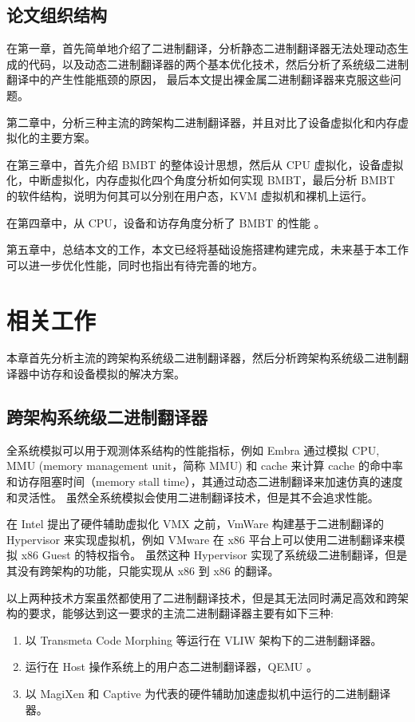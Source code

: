 \section {论文组织结构}
在第一章，首先简单地介绍了二进制翻译，分析静态二进制翻译器无法处理动态生成的代码，以及动态二进制翻译器的两个基本优化技术，然后分析了系统级二进制翻译中的产生性能瓶颈的原因，
最后本文提出裸金属二进制翻译器来克服这些问题。

第二章中，分析三种主流的跨架构二进制翻译器，并且对比了设备虚拟化和内存虚拟化的主要方案。

在第三章中，首先介绍 BMBT 的整体设计思想，然后从 CPU 虚拟化，设备虚拟化，中断虚拟化，内存虚拟化四个角度分析如何实现 BMBT，最后分析 BMBT 的软件结构，说明为何其可以分别在用户态，KVM 虚拟机和裸机上运行。

在第四章中，从 CPU，设备和访存角度分析了 BMBT 的性能 。

第五章中，总结本文的工作，本文已经将基础设施搭建构建完成，未来基于本工作可以进一步优化性能，同时也指出有待完善的地方。

\chapter{相关工作}\label{chap:related_work}
本章首先分析主流的跨架构系统级二进制翻译器，然后分析跨架构系统级二进制翻译器中访存和设备模拟的解决方案。

\section{跨架构系统级二进制翻译器}
全系统模拟可以用于观测体系结构的性能指标，例如 Embra \citep{witchel1996embra} 通过模拟 CPU, MMU (memory management unit，简称 MMU) 和 cache 来计算 cache 的命中率和访存阻塞时间（memory stall time），其通过动态二进制翻译来加速仿真的速度和灵活性。
虽然全系统模拟会使用二进制翻译技术，但是其不会追求性能。

在 Intel 提出了硬件辅助虚拟化 VMX \citep{uhlig2005intel} 之前，VmWare 构建基于二进制翻译的 Hypervisor 来实现虚拟机，例如 VMware 在 x86 平台上可以使用二进制翻译来模拟 x86 Guest 的特权指令。
虽然这种 Hypervisor 实现了系统级二进制翻译，但是其没有跨架构的功能，只能实现从 x86 到 x86 的翻译。

以上两种技术方案虽然都使用了二进制翻译技术，但是其无法同时满足高效和跨架构的要求，能够达到这一要求的主流二进制翻译器主要有如下三种:

\begin{enumerate}
	\item 以 Transmeta Code Morphing 等运行在 VLIW 架构下的二进制翻译器。
	\item 运行在 Host 操作系统上的用户态二进制翻译器，QEMU 。
	\item 以 MagiXen \citep{chapman2007magixen} 和 Captive \citep{spink2016hardware} \citep{spink2020retargetable} 为代表的硬件辅助加速虚拟机中运行的二进制翻译器。
\end{enumerate}

